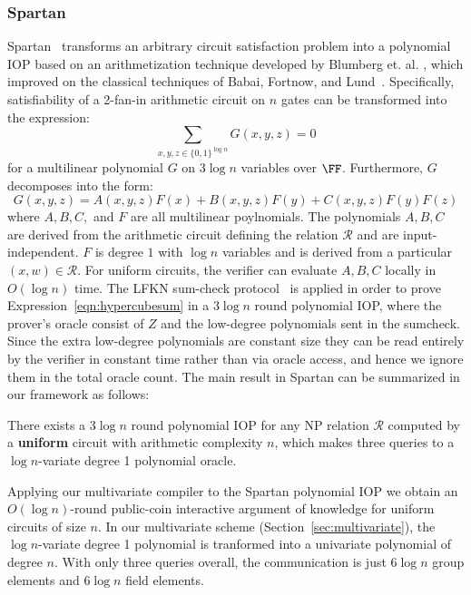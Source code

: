 \subsubsection{Spartan}
\textsf{Spartan}~\cite{Spartan} transforms an arbitrary circuit satisfaction problem into a polynomial IOP based on an arithmetization technique developed by Blumberg et. al. \cite{EPRINT:BTVW14}, which improved on the classical techniques of Babai, Fortnow, and Lund~\cite{BFL}. Specifically, satisfiability of a 2-fan-in arithmetic circuit on $n$ gates can be transformed into the expression: 
\begin{equation}\label{eqn:hypercubesum}
\sum_{x, y, z \in \{0,1\}^{\log n}} G(x, y, z) = 0
\end{equation} 
for a multilinear polynomial $G$ on $3 \log n$ variables over $\FF$. 
Furthermore, $G$ decomposes into the form: 
$$G(x,y,z) = A(x,y,z) F(x) + B(x, y, z) F(y) + C(x, y, z) F(y) F(z)$$
where $A, B, C,$ and $F$ are all multilinear poylnomials. The polynomials $A, B, C$ are derived from the arithmetic circuit defining the relation $\mathcal{R}$ and are input-independent. $F$ is degree $1$ with $\log n$ variables and is derived from a particular $(x, w) \in \mathcal{R}$. For uniform circuits, the verifier can evaluate $A, B, C$ locally in $O(\log n )$ time. The LFKN sum-check protocol~\cite{FOCS:LFKN90} is applied in order to prove Expression~\ref{eqn:hypercubesum} in a $3\log n$ round polynomial IOP, where the prover's oracle consist of $Z$ and the low-degree polynomials sent in the sumcheck. Since the extra low-degree polynomials are constant size they can be read entirely by the verifier in constant time rather than via oracle access, and hence we ignore them in the total oracle count. The main result in Spartan can be summarized in our framework as follows: 

\begin{theorem}[Setty19]
There exists a $3 \log n$ round polynomial IOP for any NP relation $\mathcal{R}$ computed by a \textbf{uniform} circuit with arithmetic complexity $n$, which makes three queries to a $\log n$-variate degree 1 polynomial oracle.  
\end{theorem}

Applying our multivariate compiler to the \textsf{Spartan} polynomial IOP we obtain an $O(\log n)$-round public-coin interactive argument of knowledge for uniform circuits of size $n$. In our multivariate scheme (Section~\ref{sec:multivariate}), the $\log n$-variate degree 1 polynomial is tranformed into a univariate polynomial of degree $n$. With only three queries overall, the communication is just $6 \log n$ group elements and $6 \log n$ field elements. 

